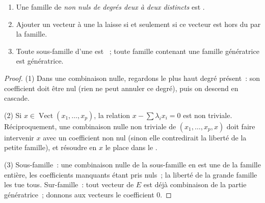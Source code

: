 \begin{proposition}\label{prop:b1:vspaces:freecriteria}
\begin{enumerate}
  \item Une famille de \emph{ non nuls de degrés deux à deux
        distincts} est .
  \item Ajouter un vecteur à une  la laisse  si et
        seulement si ce vecteur est hors du  par
        la famille.
  \item Toute sous-famille d'une  est ~; toute
        famille contenant une famille génératrice est génératrice.
\end{enumerate}
\end{proposition}

\begin{proof}
(1) Dans une combinaison nulle, regardons le plus haut degré
présent~: son coefficient doit être nul (rien ne peut annuler ce
degré), puis on descend en cascade.

(2) Si $x \in \operatorname{Vect}(x_1, \dots, x_p)$, la relation $x
- \sum\lambda_i x_i = 0$ est non triviale. Réciproquement, une
combinaison nulle non triviale de $(x_1, \dots, x_p, x)$ doit faire
intervenir $x$ avec un coefficient non nul (sinon elle contredirait la
liberté de la petite famille), et résoudre en $x$ le place dans le
.

(3) Sous-famille~: une combinaison nulle de la sous-famille en est une
de la famille entière, les coefficients manquants étant pris nuls~; la
liberté de la grande famille les tue tous. Sur-famille~: tout vecteur
de $E$ est déjà combinaison de la partie génératrice~; donnons aux
vecteurs  le coefficient $0$.
\end{proof}

